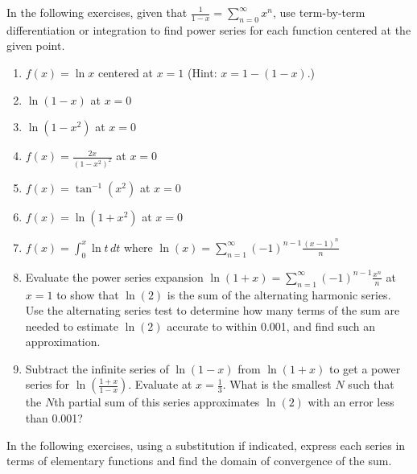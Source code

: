 \documentclass{exercises}
\begin{document}
In the following exercises, given that $\frac{1}{1-x}=\sum_{n=0}^{\infty}x^{n}$, use term-by-term differentiation or integration to find power series for each function centered at the given point.

\begin{enumerate}[resume]
\item $f(x)=\ln x$ centered at $x=1$ (Hint: $x=1-(1-x)$.)
\item $\ln (1-x)$ at $x=0$
\item $\ln (1-x^{2})$ at $x=0$
\item $f(x)=\frac{2x}{{(1-x^{2})}^{2}}$ at $x=0$
\item $f(x)=\tan^{-1}(x^{2})$ at $x=0$
\item $f(x)=\ln (1+x^{2})$ at $x=0$
\item $f(x)=\int_{0}^{x}\ln t\,dt$ where $\ln (x)=\sum_{n=1}^{\infty}{(-1)}^{n-1}\frac{{(x-1)}^{n}}{n}$
\item \techrequired Evaluate the power series expansion $\ln (1+x)=\sum_{n=1}^{\infty}{(-1)}^{n-1}\frac{x^{n}}{n}$ at $x=1$ to show that $\ln (2)$ is the sum of the alternating harmonic series. Use the alternating series test to determine how many terms of the sum are needed to estimate $\ln (2)$ accurate to within 0.001, and find such an approximation.
\item \techrequired Subtract the infinite series of $\ln (1-x)$ from $\ln (1+x)$ to get a power series for $\ln (\frac{1+x}{1-x})$. Evaluate at $x=\frac{1}{3}$. What is the smallest $N$ such that the $N$th partial sum of this series approximates $\ln (2)$ with an error less than 0.001?
\end{enumerate}

In the following exercises, using a substitution if indicated, express each series in terms of elementary functions and find the domain of convergence of the sum.
\end{document}
